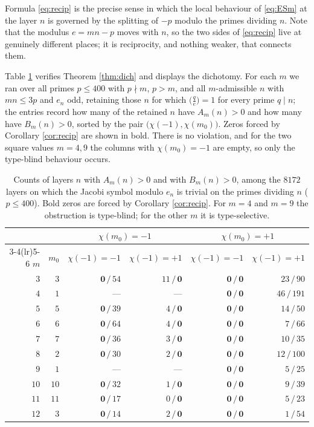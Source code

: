 \documentclass[11pt,reqno]{amsart}
\theoremstyle{plain}
\theoremstyle{definition}
\numberwithin{equation}{section}
\begin{document}
Formula \eqref{eq:recip} is the precise sense in which the local behaviour of
\eqref{eq:ESm} at the layer $n$ is governed by the splitting of $-p$ modulo the primes
dividing $n$. Note that the modulus $e=mn-p$ moves with $n$, so the two sides of
\eqref{eq:recip} live at genuinely different places; it is reciprocity, and nothing
weaker, that connects them.

Table \ref{tab:dich} verifies Theorem \ref{thm:dich} and displays the dichotomy. For
each $m$ we ran over all primes $p\le400$ with $p\nmid m$, $p>m$, and all
$m$-admissible $n$ with $mn\le3p$ and $e_{n}$ odd, retaining those $n$ for which
$\bigl(\tfrac qe\bigr)=1$ for every prime $q\mid n$; the entries record how many of the
retained $n$ have $A_{m}(n)>0$ and how many have $B_{m}(n)>0$, sorted by the pair
$\bigl(\chi(-1),\chi(m_{0})\bigr)$. Zeros forced by Corollary \ref{cor:recip} are shown
in bold. There is no violation, and for the two square values $m=4,9$ the columns with
$\chi(m_{0})=-1$ are empty, so only the type-blind behaviour occurs.

\begin{table}[t]
\centering\small
\begin{tabular}{rr rr rr}
\toprule
&& \multicolumn{2}{c}{$\chi(m_{0})=-1$} & \multicolumn{2}{c}{$\chi(m_{0})=+1$}\\
\cmidrule(lr){3-4}\cmidrule(lr){5-6}
$m$ & $m_{0}$ & $\chi(-1)=-1$ & $\chi(-1)=+1$ & $\chi(-1)=-1$ & $\chi(-1)=+1$\\
\midrule
$3$ & $3$ & $\mathbf 0\,/\,54$ & $11\,/\,\mathbf 0$ & $\mathbf 0\,/\,\mathbf 0$ & $23\,/\,90$\\
$4$ & $1$ & --- & --- & $\mathbf 0\,/\,\mathbf 0$ & $46\,/\,191$\\
$5$ & $5$ & $\mathbf 0\,/\,39$ & $4\,/\,\mathbf 0$ & $\mathbf 0\,/\,\mathbf 0$ & $14\,/\,50$\\
$6$ & $6$ & $\mathbf 0\,/\,64$ & $4\,/\,\mathbf 0$ & $\mathbf 0\,/\,\mathbf 0$ & $7\,/\,66$\\
$7$ & $7$ & $\mathbf 0\,/\,36$ & $3\,/\,\mathbf 0$ & $\mathbf 0\,/\,\mathbf 0$ & $10\,/\,35$\\
$8$ & $2$ & $\mathbf 0\,/\,30$ & $2\,/\,\mathbf 0$ & $\mathbf 0\,/\,\mathbf 0$ & $12\,/\,100$\\
$9$ & $1$ & --- & --- & $\mathbf 0\,/\,\mathbf 0$ & $5\,/\,25$\\
$10$ & $10$ & $\mathbf 0\,/\,32$ & $1\,/\,\mathbf 0$ & $\mathbf 0\,/\,\mathbf 0$ & $9\,/\,39$\\
$11$ & $11$ & $\mathbf 0\,/\,17$ & $0\,/\,\mathbf 0$ & $\mathbf 0\,/\,\mathbf 0$ & $5\,/\,23$\\
$12$ & $3$ & $\mathbf 0\,/\,14$ & $2\,/\,\mathbf 0$ & $\mathbf 0\,/\,\mathbf 0$ & $1\,/\,54$\\
\bottomrule
\end{tabular}
\caption{Counts of layers $n$ with $A_{m}(n)>0$ and with $B_{m}(n)>0$, among the
$8172$ layers on which the Jacobi symbol modulo $e_{n}$ is trivial on the primes
dividing $n$ ($p\le400$). Bold zeros are forced by Corollary \ref{cor:recip}. For
$m=4$ and $m=9$ the obstruction is type-blind; for the other $m$ it is
type-selective.}
\label{tab:dich}
\end{table}
\end{document}
